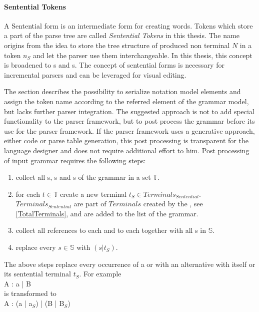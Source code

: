 \paragraph{Sentential Tokens} \label{SententialTokens}
A Sentential form is an intermediate form for creating words. Tokens which store a part of the parse tree are called \emph{Sentential Tokens} in this thesis. The name origins from the idea to store the tree structure of produced non terminal $N$ in a token $n_S$ and let the parser use them interchangeable. In this thesis, this concept is broadened to s and s. The concept of sentential forms is necessary for incremental parsers and can be leveraged for visual editing.
 
The   section describes the possibility to serialize notation model elements and assign the token name according to the referred element of the grammar model, but lacks further parser integration. The suggested approach is not to add special functionality to the parser framework, but to post process the grammar before its use for the parser framework. If the parser framework uses a generative approach, either code or parse table generation, this post processing is transparent for the language designer and does not require additional effort to him. 
Post processing of input grammar requires the following steps:
\begin{enumerate}
	\item collect all s, s and s of the grammar in a set $\mathbb{T}$.
	\item for each $t \in \mathbb{T}$ create a new terminal $t_S \in Terminals_{Sentential}$.\\ $Terminals_{Sentential}$ are part of $Terminals$ created by the , see \ref{TotalTerminals}, and are added to the  list of the grammar.
	\item collect all references to each  and to each  together with all s in $\mathbb{S}$.
	\item replace every $s \in \mathbb{S}$ with $(s | t_S)$. \label{SententialTokenSubstitution}
\end{enumerate}
  
The above steps replace every occurrence of a  or  with an alternative with itself or its sentential terminal $t_S$. 
For example\\
A : a | B \\
is transformed to  \\
A : (a | a$_S$) | (B | B$_S$)

